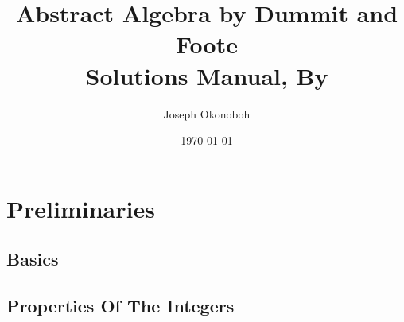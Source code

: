 \documentclass[9pt]{book}
\title{\vspace{-14cm}Abstract Algebra by Dummit and Foote \\Solutions Manual, By}
\author{Joseph Okonoboh}
\date{\today}
\begin{document}

   \chapter{Preliminaries}
      \section{Basics}
         
      \section{Properties Of The Integers}
         
\end{document}
